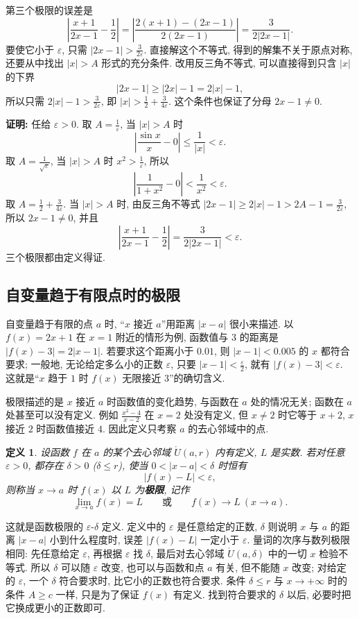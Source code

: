 \documentclass[UTF8,openany]{ctexbook}
\theoremstyle{chinesetextbook}
\newtheorem{definition}{定义}[section]
\newenvironment{cnproof}{\par\indent\textbf{证明:} \ignorespaces}{\par}
\begin{document}
第三个极限的误差是
\[
\left|\frac{x+1}{2x-1}-\frac12\right|=\left|\frac{2(x+1)-(2x-1)}{2(2x-1)}\right|=\frac3{2|2x-1|}.
\]
要使它小于 $\varepsilon$, 只需 $\displaystyle|2x-1|>\frac3{2\varepsilon}$. 直接解这个不等式, 得到的解集不关于原点对称, 还要从中找出 $|x|>A$ 形式的充分条件. 改用反三角不等式, 可以直接得到只含 $|x|$ 的下界
\[
|2x-1|\ge|2x|-1=2|x|-1,
\]
所以只需 $\displaystyle2|x|-1>\frac3{2\varepsilon}$, 即 $\displaystyle|x|>\frac12+\frac3{4\varepsilon}$. 这个条件也保证了分母 $2x-1\ne0$.
\begin{cnproof}
任给 $\varepsilon>0$. 取 $\displaystyle A=\frac1\varepsilon$, 当 $|x|>A$ 时
\[
\left|\frac{\sin x}x-0\right|\le\frac1{|x|}<\varepsilon.
\]
取 $\displaystyle A=\frac1{\sqrt\varepsilon}$, 当 $|x|>A$ 时 $\displaystyle x^2>\frac1\varepsilon$, 所以
\[
\left|\frac1{1+x^2}-0\right|<\frac1{x^2}<\varepsilon.
\]
取 $\displaystyle A=\frac12+\frac3{4\varepsilon}$. 当 $|x|>A$ 时, 由反三角不等式 $\displaystyle|2x-1|\ge2|x|-1>2A-1=\frac3{2\varepsilon}$, 所以 $2x-1\ne0$, 并且
\[
\left|\frac{x+1}{2x-1}-\frac12\right|=\frac3{2|2x-1|}<\varepsilon.
\]
三个极限都由定义得证.
\end{cnproof}
\subsection{自变量趋于有限点时的极限}
自变量趋于有限的点 $a$ 时, “$x$ 接近 $a$”用距离 $|x-a|$ 很小来描述. 以 $f(x)=2x+1$ 在 $x=1$ 附近的情形为例, 函数值与 $3$ 的距离是 $|f(x)-3|=2|x-1|$. 若要求这个距离小于 $0.01$, 则 $|x-1|<0.005$ 的 $x$ 都符合要求; 一般地, 无论给定多么小的正数 $\varepsilon$, 只要 $\displaystyle|x-1|<\frac\varepsilon2$, 就有 $|f(x)-3|<\varepsilon$. 这就是“$x$ 趋于 $1$ 时 $f(x)$ 无限接近 $3$”的确切含义.

极限描述的是 $x$ 接近 $a$ 时函数值的变化趋势, 与函数在 $a$ 处的情况无关; 函数在 $a$ 处甚至可以没有定义. 例如 $\displaystyle\frac{x^2-4}{x-2}$ 在 $x=2$ 处没有定义, 但 $x\ne2$ 时它等于 $x+2$, $x$ 接近 $2$ 时函数值接近 $4$. 因此定义只考察 $a$ 的去心邻域中的点.
\begin{definition}
设函数 $f$ 在 $a$ 的某个去心邻域 $\mathring U(a,r)$ 内有定义, $L$ 是实数. 若对任意 $\varepsilon>0$, 都存在 $\delta>0$ ($\delta\le r$), 使当 $0<|x-a|<\delta$ 时恒有
\[
|f(x)-L|<\varepsilon,
\]
则称当 $x\to a$ 时 $f(x)$ 以 $L$ 为\textbf{极限}, 记作
\[
\lim_{x\to a}f(x)=L\qquad\text{或}\qquad f(x)\to L\ (x\to a).
\]
\end{definition}
这就是函数极限的 $\varepsilon$-$\delta$ 定义. 定义中的 $\varepsilon$ 是任意给定的正数, $\delta$ 则说明 $x$ 与 $a$ 的距离 $|x-a|$ 小到什么程度时, 误差 $|f(x)-L|$ 一定小于 $\varepsilon$. 量词的次序与数列极限相同: 先任意给定 $\varepsilon$, 再根据 $\varepsilon$ 找 $\delta$, 最后对去心邻域 $\mathring U(a,\delta)$ 中的一切 $x$ 检验不等式. 所以 $\delta$ 可以随 $\varepsilon$ 改变, 也可以与函数和点 $a$ 有关, 但不能随 $x$ 改变; 对给定的 $\varepsilon$, 一个 $\delta$ 符合要求时, 比它小的正数也符合要求. 条件 $\delta\le r$ 与 $x\to+\infty$ 时的条件 $A\ge c$ 一样, 只是为了保证 $f(x)$ 有定义. 找到符合要求的 $\delta$ 以后, 必要时把它换成更小的正数即可.
\end{document}
